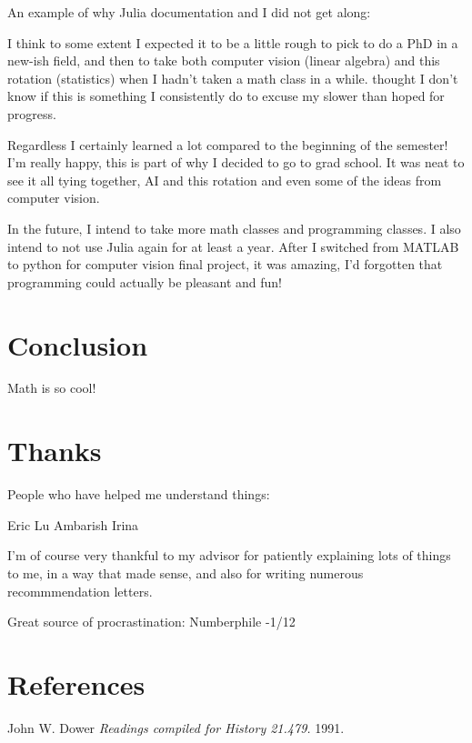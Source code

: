 \documentclass[a4paper]{article}
\begin{document}
{An example of why Julia documentation and I did not get along:

I think to some extent I expected it to be a little rough to pick to do a PhD in a new-ish
field, and then to take both computer vision (linear algebra) and this rotation
(statistics) when I hadn't taken a math class in a while. thought I don't know if this
is something I consistently do to excuse my slower than hoped for progress.

Regardless I certainly learned a lot compared to the beginning of the semester!
I'm really happy, this is part of why I decided to go to grad school. It was
neat to see it all tying together, AI and this rotation and even some of the
ideas from computer vision.

In the future, I intend to take more math classes and programming classes. I
also intend to not use Julia again for at least a year. After I switched from
MATLAB to python for computer vision final project, it was amazing, I'd
forgotten that programming could actually be pleasant and fun!

\section{Conclusion}

Math is so cool!

\section{Thanks}

People who have helped me understand things:

Eric Lu
Ambarish
Irina

I'm of course very thankful to my advisor for patiently explaining lots of
things to me, in a way that made sense, and also for writing numerous
recommmendation letters.

Great source of procrastination: Numberphile
-1/12






\section{References}

\begin{thebibliography}{1}

 John W. Dower {\em Readings compiled for History
21.479.}  1991.


\end{thebibliography}}
\end{document}
